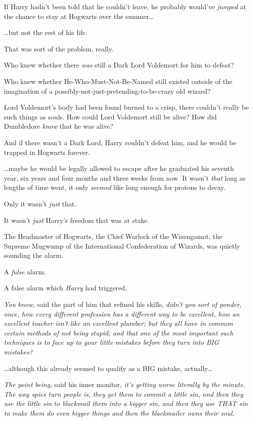 If Harry hadn't been told that he couldn't leave, he probably would've
\emph{jumped} at the chance to stay at Hogwarts over the summer\ldots{}

\ldots{}but not the rest of his life.

That was sort of the problem, really.

Who knew whether there \emph{was} still a Dark Lord Voldemort for him to
defeat?

Who knew whether He-Who-Must-Not-Be-Named still existed outside of the
imagination of a possibly-not-just-pretending-to-be-crazy old wizard?

Lord Voldemort's body had been found burned to a crisp, there couldn't
really be such things as souls. How could Lord Voldemort still be alive?
How did Dumbledore \emph{know} that he was alive?

And if there wasn't a Dark Lord, Harry couldn't defeat him, and he would
be trapped in Hogwarts forever.

\ldots{}maybe he would be legally allowed to escape after he graduated
his seventh year, six years and four months and three weeks from now. It
wasn't \emph{that} long as lengths of time went, it only \emph{seemed}
like long enough for protons to decay.

Only it wasn't \emph{just} that.

It wasn't \emph{just} Harry's freedom that was at stake.

The Headmaster of Hogwarts, the Chief Warlock of the Wizengamot, the
Supreme Mugwump of the International Confederation of Wizards, was
quietly sounding the alarm.

A \emph{false} alarm.

A false alarm which \emph{Harry} had triggered.

\emph{You know,} said the part of him that refined his skills,
\emph{didn't you sort of ponder, once, how every different profession
has a different way to be excellent, how an excellent teacher isn't like
an excellent plumber; but they all have in common certain methods of not
being stupid; and that one of the most important such techniques is to
face up to your little mistakes before they turn into BIG mistakes?}

\ldots{}although this already seemed to qualify as a BIG mistake,
actually\ldots{}

\emph{The point being,} said his inner monitor, \emph{it's getting worse
literally by the minute. The way spies turn people is, they get them to
commit a little sin, and then they use the little sin to blackmail them
into a bigger sin, and then they use THAT sin to make them do even
bigger things and then the blackmailer owns their soul.}

